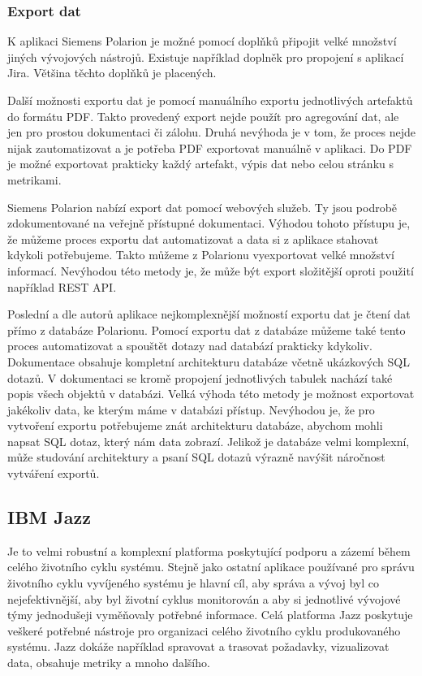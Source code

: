 \documentclass[czech,master,public,dept460,male,cpdeclaration,oneside]{diploma}
\begin{document}
\subsubsection{Export dat}
K aplikaci Siemens Polarion je možné pomocí doplňků připojit velké množství jiných vývojových nástrojů. Existuje například doplněk pro propojení s aplikací Jira. Většina těchto doplňků je placených. \cite{ref:polarion_extensions}

Další možnosti exportu dat je pomocí manuálního exportu jednotlivých artefaktů do formátu PDF. Takto provedený export nejde použít pro agregování dat, ale jen pro prostou dokumentaci či zálohu. Druhá nevýhoda je v tom, že proces nejde nijak zautomatizovat a je potřeba PDF exportovat manuálně v aplikaci. Do PDF je možné exportovat prakticky každý artefakt, výpis dat nebo celou stránku s metrikami.

Siemens Polarion nabízí export dat pomocí webových služeb. Ty jsou podrobě zdokumentované na veřejně přístupné dokumentaci. \cite{ref:polarion_documentation} Výhodou tohoto přístupu je, že můžeme proces exportu dat automatizovat a data si z aplikace stahovat kdykoli potřebujeme. Takto můžeme z Polarionu vyexportovat velké množství informací. Nevýhodou této metody je, že může být export složitější oproti použití například REST API.

Poslední a dle autorů aplikace nejkomplexnější možností exportu dat je čtení dat přímo z databáze Polarionu. Pomocí exportu dat z databáze můžeme také tento proces automatizovat a spouštět dotazy nad databází prakticky kdykoliv. Dokumentace obsahuje kompletní architekturu databáze včetně ukázkových SQL dotazů. \cite{ref:polarion_documentation} V dokumentaci se kromě propojení jednotlivých tabulek nachází také popis všech objektů v databázi. Velká výhoda této metody je možnost exportovat jakékoliv data, ke kterým máme v databázi přístup. Nevýhodou je, že pro vytvoření exportu potřebujeme znát architekturu databáze, abychom mohli napsat SQL dotaz, který nám data zobrazí. Jelikož je databáze velmi komplexní, může studování architektury a psaní SQL dotazů výrazně navýšit náročnost vytváření exportů.

\subsection{IBM Jazz}
Je to velmi robustní a komplexní platforma poskytující podporu a zázemí během celého životního cyklu systému. Stejně jako ostatní aplikace používané pro správu životního cyklu vyvíjeného systému je hlavní cíl, aby správa a vývoj byl co nejefektivnější, aby byl životní cyklus monitorován a aby si jednotlivé vývojové týmy jednodušeji vyměňovaly potřebné informace. Celá platforma Jazz poskytuje veškeré potřebné nástroje pro organizaci celého životního cyklu produkovaného systému. Jazz dokáže například spravovat a trasovat požadavky, vizualizovat data, obsahuje metriky a mnoho dalšího. \cite{ref:jazz}
\end{document}
